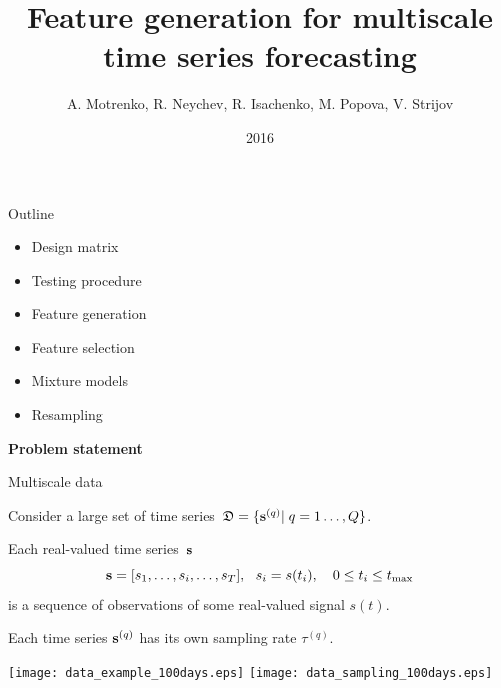 \documentclass{beamer}
\title[\hbox to 56mm{Multiscale forecasting\hfill\insertframenumber\,/\,\inserttotalframenumber}]{Feature generation for multiscale time series forecasting}
\author[V. Strijov]{A. Motrenko, R. Neychev, R. Isachenko, M. Popova, V. Strijov}
\institute{Moscow Institute of Physics and Technology}
\date{2016}
\begin{document}
\begin{frame}
\maketitle
\end{frame}
\begin{frame}{Outline}


\begin{itemize}
\item Design matrix
\item Testing procedure
\item Feature generation
\item Feature selection
\item Mixture models
\item Resampling
\end{itemize}

\end{frame}
\begin{frame}
\vfill
\begin{center}
{\Large \bf Problem statement}
\end{center}
\vfill
\end{frame}
\begin{frame}{Multiscale data}

Consider a large set of time series~${\mathfrak{D}}=\{{\mathbf{s}}^{(q)}| \; q = 1\dots, {Q}\}$.

\smallskip
Each real-valued time series~${\mathbf{s}}$ \[ {\mathbf{s}} = [s_1, \dots, s_i, \dots, s_{T}], ~~ s_i = s(t_i),\quad 0 \leq t_i \leq t_{\max}\]
is a sequence of observations  of some real-valued signal $s(t)$.


\smallskip
Each time series ${\mathbf{s}}^{(q)}$ has its own sampling rate $\tau^{(q)}$.

\texttt{[image: data\_example\_100days.eps]}
\texttt{[image: data\_sampling\_100days.eps]}

\end{frame}
\end{document}
